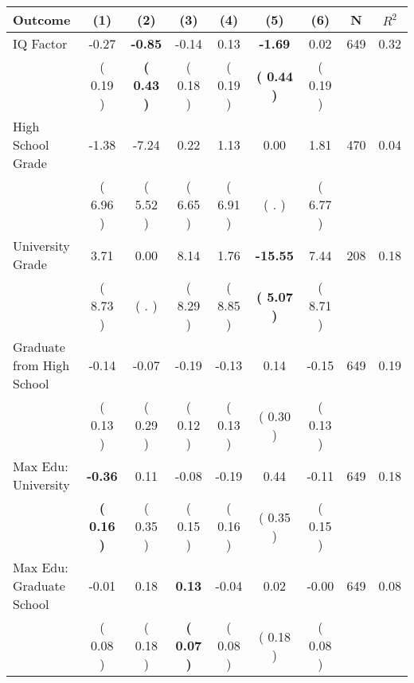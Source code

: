 \begin{tabular}{lcccccccc}
\toprule
 \textbf{Outcome} & \textbf{(1)} & \textbf{(2)} & \textbf{(3)} & \textbf{(4)} & \textbf{(5)} & \textbf{(6)} & \textbf{N} & \textbf{$ R^2$} \\
\midrule
IQ Factor &     -0.27 & \textbf{    -0.85} &     -0.14 &      0.13 & \textbf{    -1.69} &      0.02 & 649 &       0.32 \\ 
 & (     0.19 ) & \textbf{(     0.43 )} & (     0.18 ) & (     0.19 ) & \textbf{(     0.44 )} & (     0.19 ) & \\
High School Grade &     -1.38 &     -7.24 &      0.22 &      1.13 &      0.00 &      1.81 & 470 &       0.04 \\ 
 & (     6.96 ) & (     5.52 ) & (     6.65 ) & (     6.91 ) & (        . ) & (     6.77 ) & \\
University Grade &      3.71 &      0.00 &      8.14 &      1.76 & \textbf{   -15.55} &      7.44 & 208 &       0.18 \\ 
 & (     8.73 ) & (        . ) & (     8.29 ) & (     8.85 ) & \textbf{(     5.07 )} & (     8.71 ) & \\
Graduate from High School &     -0.14 &     -0.07 &     -0.19 &     -0.13 &      0.14 &     -0.15 & 649 &       0.19 \\ 
 & (     0.13 ) & (     0.29 ) & (     0.12 ) & (     0.13 ) & (     0.30 ) & (     0.13 ) & \\
Max Edu: University & \textbf{    -0.36} &      0.11 &     -0.08 &     -0.19 &      0.44 &     -0.11 & 649 &       0.18 \\ 
 & \textbf{(     0.16 )} & (     0.35 ) & (     0.15 ) & (     0.16 ) & (     0.35 ) & (     0.15 ) & \\
Max Edu: Graduate School &     -0.01 &      0.18 & \textbf{     0.13} &     -0.04 &      0.02 &     -0.00 & 649 &       0.08 \\ 
 & (     0.08 ) & (     0.18 ) & \textbf{(     0.07 )} & (     0.08 ) & (     0.18 ) & (     0.08 ) & \\
\bottomrule
\end{tabular}
